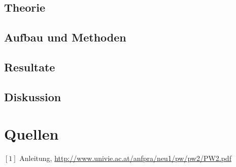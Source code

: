\documentclass[12pt,a4paper]{article}
\begin{document}
\begin{multicols}{2}
\subsection{Theorie}

\subsection{Aufbau und Methoden}

\subsection{Resultate}

\subsection{Diskussion}


\section{Quellen}
$[1]$ Anleitung, \url{http://www.univie.ac.at/anfpra/neu1/pw/pw2/PW2.pdf}\\
\end{multicols}
\end{document}
